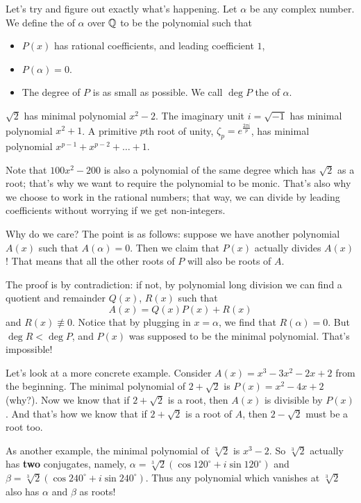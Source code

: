 Let's try and figure out exactly what's happening.
Let $\alpha$ be any complex number.
We define the  of $\alpha$ over $\mathbb Q$ to be the polynomial such that
\begin{itemize}
	\item $P(x)$ has rational coefficients, and leading coefficient $1$,
	\item $P(\alpha) = 0$.
	\item The degree of $P$ is as small as possible.
		We call $\deg P$ the  of $\alpha$.
\end{itemize}
\begin{example}
	\listhack
	\begin{enumerate}[(a)]
	\ii $\sqrt 2$ has minimal polynomial $x^2-2$.
	\ii The imaginary unit $i = \sqrt{-1}$ has minimal polynomial $x^2+1$.
	\ii A primitive $p$th root of unity, $\zeta_p = e^{\frac{2\pi i}{p}}$, has minimal polynomial $x^{p-1} + x^{p-2} + \dots + 1$.
	\end{enumerate}
\end{example}
Note that $100x^2 - 200$ is also a polynomial of the same degree which has $\sqrt 2$ as a root; that's why we want to require the polynomial to be monic. That's also why we choose to work in the rational numbers; that way, we can divide by leading coefficients without worrying if we get non-integers.

Why do we care? The point is as follows: suppose we have another polynomial $A(x)$ such that $A(\alpha) = 0$.
Then we claim that $P(x)$ actually divides $A(x)$!
That means that all the other roots of $P$ will also be roots of $A$.

The proof is by contradiction: if not, by polynomial long division we can find a quotient and remainder $Q(x)$, $R(x)$ such that
\[ A(x) = Q(x) P(x) + R(x) \]
and $R(x) \not\equiv 0$.
Notice that by plugging in $x = \alpha$, we find that $R(\alpha) = 0$.
But $\deg R < \deg P$, and $P(x)$ was supposed to be the minimal polynomial.
That's impossible!

Let's look at a more concrete example.
Consider $A(x) = x^3-3x^2-2x+2$ from the beginning. 
The minimal polynomial of $2 + \sqrt 2$ is $P(x) = x^2 - 4x + 2$ (why?).
Now we know that if $2 + \sqrt 2$ is a root, then $A(x)$ is divisible by $P(x)$.
And that's how we know that if $2 + \sqrt 2$ is a root of $A$, then $2 - \sqrt 2$ must be a root too.

As another example, the minimal polynomial of $\sqrt[3]{2}$ is $x^3-2$. So $\sqrt[3]{2}$ actually has \textbf{two} conjugates, namely, $\alpha = \sqrt[3]{2} \left( \cos 120^\circ + i \sin 120^\circ \right)$ and $\beta = \sqrt[3]{2} \left( \cos 240^\circ + i \sin 240^\circ \right)$. Thus any polynomial which vanishes at $\sqrt[3]{2}$ also has $\alpha$ and $\beta$ as roots!

